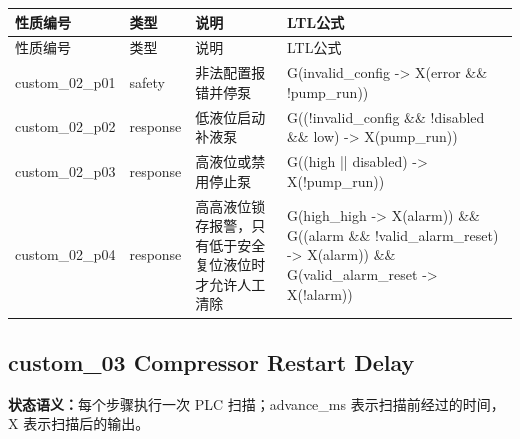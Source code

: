 \begin{longtable}{L{2.3cm}L{1.7cm}L{4.1cm}L{5.2cm}}

\toprule

性质编号 & 类型 & 说明 & LTL公式\\

\midrule

\endfirsthead

\toprule

性质编号 & 类型 & 说明 & LTL公式\\

\midrule

\endhead

{\ttfamily custom\_02\_p01} & safety & 非法配置报错并停泵 & {\ttfamily G(invalid\_config -> X(error \&\& !pump\_run))}\\

{\ttfamily custom\_02\_p02} & response & 低液位启动补液泵 & {\ttfamily G((!invalid\_config \&\& !disabled \&\& low) -> X(pump\_run))}\\

{\ttfamily custom\_02\_p03} & response & 高液位或禁用停止泵 & {\ttfamily G((high || disabled) -> X(!pump\_run))}\\

{\ttfamily custom\_02\_p04} & response & 高高液位锁存报警，只有低于安全复位液位时才允许人工清除 & {\ttfamily G(high\_high -> X(alarm)) \&\& G((alarm \&\& !valid\_alarm\_reset) -> X(alarm)) \&\& G(valid\_alarm\_reset -> X(!alarm))}\\

\bottomrule

\end{longtable}

\subsection{{\ttfamily custom\_03} Compressor Restart Delay}

\noindent\textbf{状态语义：}每个步骤执行一次 PLC 扫描；advance\_ms 表示扫描前经过的时间，X 表示扫描后的输出。


